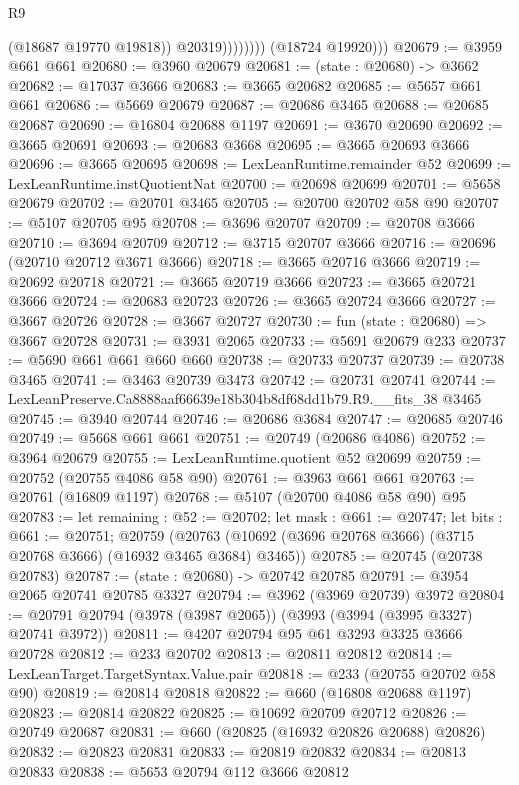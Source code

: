 \begin{lexlean}{R9}
\begin{coremodule}
                          (@18687 @19770 @19818))
                        @20319))))))))
        (@18724 @19920)))
@20679 := @3959 @661 @661
@20680 := @3960 @20679
@20681 := (state : @20680) -> @3662
@20682 := @17037 @3666
@20683 := @3665 @20682
@20685 := @5657 @661 @661
@20686 := @5669 @20679
@20687 := @20686 @3465
@20688 := @20685 @20687
@20690 := @16804 @20688 @1197
@20691 := @3670 @20690
@20692 := @3665 @20691
@20693 := @20683 @3668
@20695 := @3665 @20693 @3666
@20696 := @3665 @20695
@20698 := LexLeanRuntime.remainder @52
@20699 := LexLeanRuntime.instQuotientNat
@20700 := @20698 @20699
@20701 := @5658 @20679
@20702 := @20701 @3465
@20705 := @20700 @20702 @58 @90
@20707 := @5107 @20705 @95
@20708 := @3696 @20707
@20709 := @20708 @3666
@20710 := @3694 @20709
@20712 := @3715 @20707 @3666
@20716 := @20696 (@20710 @20712 @3671 @3666)
@20718 := @3665 @20716 @3666
@20719 := @20692 @20718
@20721 := @3665 @20719 @3666
@20723 := @3665 @20721 @3666
@20724 := @20683 @20723
@20726 := @3665 @20724 @3666
@20727 := @3667 @20726
@20728 := @3667 @20727
@20730 := fun (state : @20680) => @3667 @20728
@20731 := @3931 @2065
@20733 := @5691 @20679 @233
@20737 := @5690 @661 @661 @660 @660
@20738 := @20733 @20737
@20739 := @20738 @3465
@20741 := @3463 @20739 @3473
@20742 := @20731 @20741
@20744 := LexLeanPreserve.Ca8888aaf66639e18b304b8df68dd1b79.R9.__fits_38 @3465
@20745 := @3940 @20744
@20746 := @20686 @3684
@20747 := @20685 @20746
@20749 := @5668 @661 @661
@20751 := @20749 (@20686 @4086)
@20752 := @3964 @20679
@20755 := LexLeanRuntime.quotient @52 @20699
@20759 := @20752 (@20755 @4086 @58 @90)
@20761 := @3963 @661 @661
@20763 := @20761 (@16809 @1197)
@20768 := @5107 (@20700 @4086 @58 @90) @95
@20783 := let remaining : @52 := @20702;
  let mask : @661 := @20747;
  let bits : @661 := @20751;
  @20759 (@20763 (@10692 (@3696 @20768 @3666) (@3715 @20768 @3666) (@16932 @3465 @3684) @3465))
@20785 := @20745 (@20738 @20783)
@20787 := (state : @20680) -> @20742 @20785
@20791 := @3954 @2065 @20741 @20785 @3327
@20794 := @3962 (@3969 @20739) @3972
@20804 := @20791 @20794 (@3978 (@3987 @2065)) (@3993 (@3994 (@3995 @3327) @20741 @3972))
@20811 := @4207 @20794 @95 @61 @3293 @3325 @3666 @20728
@20812 := @233 @20702
@20813 := @20811 @20812
@20814 := LexLeanTarget.TargetSyntax.Value.pair
@20818 := @233 (@20755 @20702 @58 @90)
@20819 := @20814 @20818
@20822 := @660 (@16808 @20688 @1197)
@20823 := @20814 @20822
@20825 := @10692 @20709 @20712
@20826 := @20749 @20687
@20831 := @660 (@20825 (@16932 @20826 @20688) @20826)
@20832 := @20823 @20831
@20833 := @20819 @20832
@20834 := @20813 @20833
@20838 := @5653 @20794 @112 @3666 @20812

\end{coremodule}
\end{lexlean}
